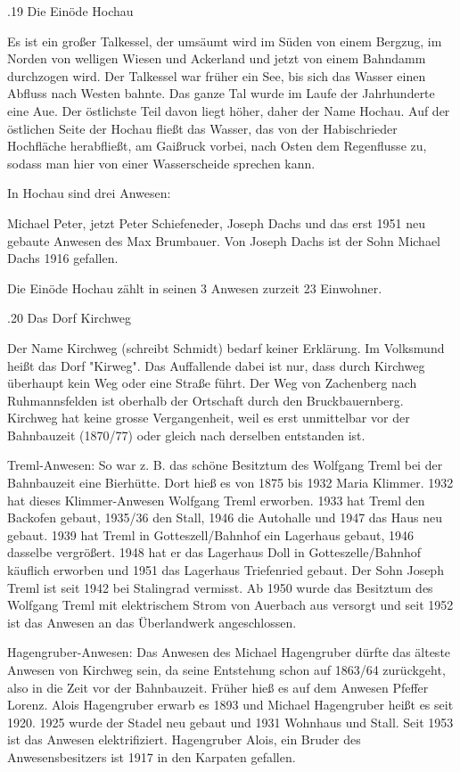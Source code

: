 .19 Die Einöde Hochau

Es ist ein großer Talkessel, der umsäumt wird im Süden von einem Bergzug, im
Norden von welligen Wiesen und Ackerland und jetzt von einem Bahndamm durchzogen
wird. Der Talkessel war früher ein See, bis sich das Wasser einen Abfluss nach
Westen bahnte. Das ganze Tal wurde im Laufe der Jahrhunderte eine Aue. Der
östlichste Teil davon liegt höher, daher der Name Hochau. Auf der östlichen
Seite der Hochau fließt das Wasser, das von der Habischrieder Hochfläche
herabfließt, am Gaißruck vorbei, nach Osten dem Regenflusse zu, sodass man hier
von einer Wasserscheide sprechen kann.

In Hochau sind drei Anwesen:

Michael Peter, jetzt Peter Schiefeneder, Joseph Dachs und das erst 1951 neu
gebaute Anwesen des Max Brumbauer. Von Joseph Dachs ist der Sohn Michael Dachs
1916 gefallen.

Die Einöde Hochau zählt in seinen 3 Anwesen zurzeit 23 Einwohner.

.20 Das Dorf Kirchweg

Der Name Kirchweg (schreibt Schmidt) bedarf keiner Erklärung. Im Volksmund heißt
das Dorf "Kirweg". Das Auffallende dabei ist nur, dass durch Kirchweg überhaupt
kein Weg oder eine Straße führt. Der Weg von Zachenberg nach Ruhmannsfelden ist
oberhalb der Ortschaft durch den Bruckbauernberg. Kirchweg hat keine grosse
Vergangenheit, weil es erst unmittelbar vor der Bahnbauzeit (1870/77) oder
gleich nach derselben entstanden ist.

Treml-Anwesen: So war z. B. das schöne Besitztum des Wolfgang Treml bei der
Bahnbauzeit eine Bierhütte. Dort hieß es von 1875 bis 1932 Maria Klimmer. 1932
hat dieses Klimmer-Anwesen Wolfgang Treml erworben. 1933 hat Treml den Backofen
gebaut, 1935/36 den Stall, 1946 die Autohalle und 1947 das Haus neu gebaut. 1939
hat Treml in Gotteszell/Bahnhof ein Lagerhaus gebaut, 1946 dasselbe vergrößert.
1948 hat er das Lagerhaus Doll in Gotteszelle/Bahnhof käuflich erworben und 1951
das Lagerhaus Triefenried gebaut. Der Sohn Joseph Treml ist seit 1942 bei
Stalingrad vermisst. Ab 1950 wurde das Besitztum des Wolfgang Treml mit
elektrischem Strom von Auerbach aus versorgt und seit 1952 ist das Anwesen an
das Überlandwerk angeschlossen.

Hagengruber-Anwesen: Das Anwesen des Michael Hagengruber dürfte das älteste
Anwesen von Kirchweg sein, da seine Entstehung schon auf 1863/64 zurückgeht,
also in die Zeit vor der Bahnbauzeit. Früher hieß es auf dem Anwesen Pfeffer
Lorenz. Alois Hagengruber erwarb es 1893 und Michael Hagengruber heißt es seit
1920. 1925 wurde der Stadel neu gebaut und 1931 Wohnhaus und Stall. Seit 1953
ist das Anwesen elektrifiziert. Hagengruber Alois, ein Bruder des
Anwesensbesitzers ist 1917 in den Karpaten gefallen.

